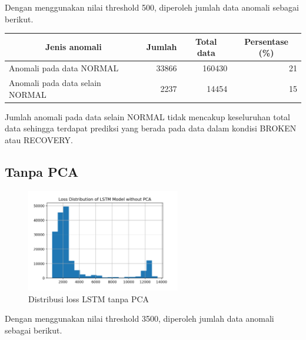     Dengan menggunakan nilai threshold 500, diperoleh jumlah data anomali sebagai berikut.

    \begin{table}[h]
        \centering
        \begin{tabular}{|l|r|r|r|}
            \hline
            \multicolumn{1}{|c|}{\textbf{Jenis anomali}} & \multicolumn{1}{c|}{\textbf{Jumlah}} & \multicolumn{1}{c|}{\textbf{Total data}} & \multicolumn{1}{c|}{\textbf{Persentase (\%)}} \\ \hline
            Anomali pada data NORMAL                     & 33866                                & 160430                                   & 21                                       \\ \hline
            Anomali pada data selain NORMAL              & 2237                                 & 14454                                    & 15                                       \\ \hline
        \end{tabular}
    \end{table}

    Jumlah anomali pada data selain NORMAL tidak mencakup keseluruhan total data sehingga terdapat prediksi yang berada pada data dalam kondisi BROKEN atau RECOVERY.

    \subsection{Tanpa PCA}

    \begin{figure}[h]
        \centering
        \includegraphics[width=0.6\textwidth]{resources/LSTM/LSTM_noPCA_LossDist.png}
        \caption{Distribusi loss LSTM tanpa PCA}
    \end{figure}

    Dengan menggunakan nilai threshold 3500, diperoleh jumlah data anomali sebagai berikut.

